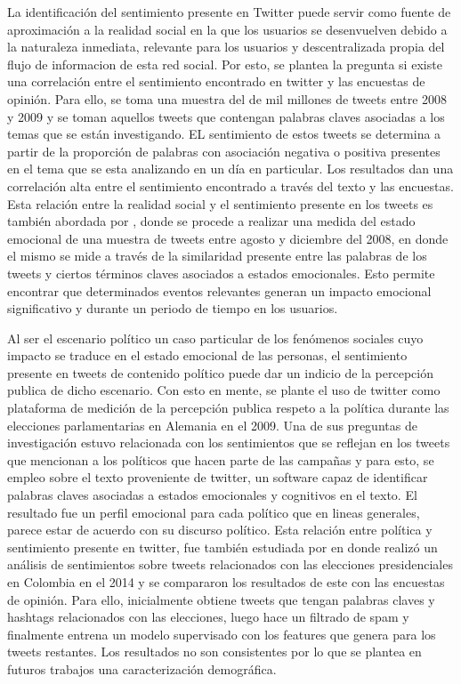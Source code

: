 La identificación del sentimiento presente en Twitter puede servir como fuente de aproximación a la realidad social en la que los usuarios se desenvuelven debido a la naturaleza inmediata, relevante para los usuarios y descentralizada propia del flujo de informacion de esta red social. Por esto,\cite{o2010tweets} se plantea la pregunta si existe una correlación entre el sentimiento encontrado en twitter y las encuestas de opinión. Para ello, se toma una muestra del de mil millones de tweets entre 2008 y 2009 y se toman aquellos tweets que contengan palabras claves asociadas a los temas que se están investigando. EL sentimiento de estos tweets se determina a partir de la proporción de palabras con asociación negativa o positiva presentes en el tema que se esta analizando en un día en particular. Los resultados dan una correlación alta entre el sentimiento encontrado a través del texto y las encuestas. Esta relación entre la realidad social y el sentimiento presente en los tweets es también abordada por \cite{bollen2011modeling}, donde se procede a realizar una medida del estado emocional de una muestra de tweets entre agosto y diciembre del 2008, en donde el mismo se mide a través de la similaridad presente entre las palabras de los tweets y ciertos términos claves asociados a estados emocionales. Esto permite encontrar que determinados eventos relevantes generan un impacto emocional significativo y durante un periodo de tiempo en los usuarios.

Al ser el escenario político un caso particular de los fenómenos sociales cuyo impacto se traduce en el estado emocional de las personas, el sentimiento presente en tweets de contenido político puede dar un indicio de la percepción publica de dicho escenario. Con esto en mente, \cite{tumasjan2010predicting} se plante el uso de twitter como plataforma de medición de la percepción publica respeto a la política durante las elecciones parlamentarias en Alemania en el 2009. Una de sus preguntas de investigación estuvo relacionada con los sentimientos que se reflejan en los tweets que mencionan a los políticos que hacen parte de las campañas y para esto, se empleo sobre el texto proveniente de twitter, un software capaz de identificar palabras claves asociadas a estados emocionales y cognitivos en el texto. El resultado fue un perfil emocional para cada político que en lineas generales, parece estar de acuerdo con su discurso político. Esta relación entre política y sentimiento presente en twitter, fue también  estudiada por  \cite{ceron2016sentiment} en donde realizó un análisis de sentimientos sobre tweets relacionados con las elecciones presidenciales en Colombia en el 2014 y se compararon los resultados de este con las encuestas de opinión. Para ello, inicialmente obtiene tweets que tengan  palabras claves y hashtags relacionados con las elecciones, luego hace un filtrado de spam y finalmente entrena un modelo supervisado con los features que genera para los tweets restantes. Los resultados no son consistentes por lo que se plantea en futuros trabajos  una caracterización demográfica.

